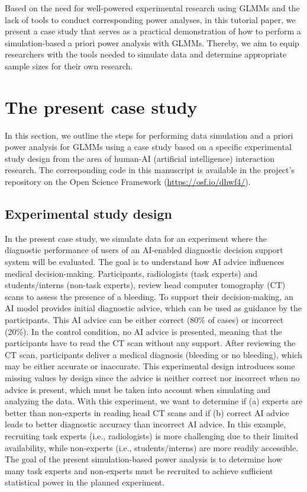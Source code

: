 \documentclass[
  man,floatsintext]{apa6}
\begin{document}
Based on the need for well-powered experimental research using GLMMs and the lack of tools to conduct corresponding power analyses, in this tutorial paper, we present a case study that serves as a practical demonstration of how to perform a simulation-based a priori power analysis with GLMMs. Thereby, we aim to equip researchers with the tools needed to simulate data and determine appropriate sample sizes for their own research.

\hypertarget{the-present-case-study}{%
\section{The present case study}\label{the-present-case-study}}

In this section, we outline the steps for performing data simulation and a priori power analysis for GLMMs using a case study based on a specific experimental study design from the area of human-AI (artificial intelligence) interaction research. The corresponding code in this manuscript is available in the project's repository on the Open Science Framework (\url{https://osf.io/dhwf4/}).

\hypertarget{experimental-study-design}{%
\subsection{Experimental study design}\label{experimental-study-design}}

In the present case study, we simulate data for an experiment where the diagnostic performance of users of an AI-enabled diagnostic decision support system will be evaluated.
The goal is to understand how AI advice influences medical decision-making. Participants, radiologists (task experts) and students/interns (non-task experts), review head computer tomography (CT) scans to assess the presence of a bleeding.
To support their decision-making, an AI model provides initial diagnostic advice, which can be used as guidance by the participants. This AI advice can be either correct (80\% of cases) or incorrect (20\%). In the control condition, no AI advice is presented, meaning that the participants have to read the CT scan without any support. After reviewing the CT scan, participants deliver a medical diagnosis (bleeding or no bleeding), which may be either accurate or inaccurate.
This experimental design introduces some missing values by design since the advice is neither correct nor incorrect when no advice is present, which must be taken into account when simulating and analyzing the data. With this experiment, we want to determine if (a) experts are better than non-experts in reading head CT scans and if (b) correct AI advice leads to better diagnostic accuracy than incorrect AI advice.
In this example, recruiting task experts (i.e., radiologists) is more challenging due to their limited availability, while non-experts (i.e., students/interns) are more readily accessible.
The goal of the present simulation-based power analysis is to determine how many task experts and non-experts must be recruited to achieve sufficient statistical power in the planned experiment.
\end{document}
